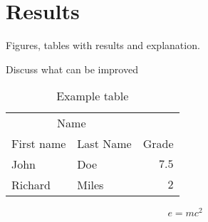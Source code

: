 \section{Results}

Figures, tables with results and explanation.

Discuss what can be improved
		
\begin{table}
	\caption{Example table}
	\centering
	\begin{tabular}{llr}
		\toprule
		\multicolumn{2}{c}{Name} \\
		\cmidrule(r){1-2}
		First name & Last Name & Grade \\
		\midrule
		John & Doe & $7.5$ \\
		Richard & Miles & $2$ \\
		\bottomrule
	\end{tabular}
\end{table}
	
\blindtext %

\begin{equation}
	\label{eq:emc}
	e = mc^2
\end{equation}

\blindtext %